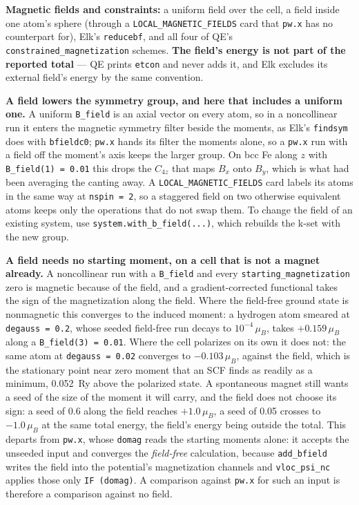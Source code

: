 \documentclass[11pt,a4paper]{article}
\newcommand{\code}[1]{\texttt{\small #1}}
\begin{document}
\textbf{Magnetic fields and constraints:} a uniform field over the cell, a field
inside one atom's sphere (through a \code{LOCAL\_MAGNETIC\_FIELDS} card that
\code{pw.x} has no counterpart for), Elk's \code{reducebf}, and all four of QE's
\code{constrained\_magnetization} schemes. \textbf{The field's energy is not part
of the reported total} --- QE prints \code{etcon} and never adds it, and Elk
excludes its external field's energy by the same convention.

\textbf{A field lowers the symmetry group, and here that includes a uniform
one.} A uniform \code{B\_field} is an axial vector on every atom, so in a
noncollinear run it enters the magnetic symmetry filter beside the moments, as
Elk's \code{findsym} does with \code{bfieldc0}; \code{pw.x} hands its filter
the moments alone, so a \code{pw.x} run with a field off the moment's axis keeps
the larger group. On bcc Fe along $z$ with \code{B\_field(1) = 0.01} this drops
the $C_{4z}$ that maps $B_x$ onto $B_y$, which is what had been averaging the
canting away. A \code{LOCAL\_MAGNETIC\_FIELDS} card labels its atoms in the
same way at \code{nspin = 2}, so a staggered field on two otherwise equivalent
atoms keeps only the operations that do not swap them. To change the field of
an existing system, use \code{system.with\_b\_field(...)}, which rebuilds the
k-set with the new group.

\textbf{A field needs no starting moment, on a cell that is not a magnet
already.} A noncollinear run with a \code{B\_field} and every
\code{starting\_magnetization} zero is magnetic because of the field, and a
gradient-corrected functional takes the sign of the magnetization along the
field. Where the field-free ground state is nonmagnetic this converges to the
induced moment: a hydrogen atom smeared at \code{degauss = 0.2}, whose seeded
field-free run decays to $10^{-4}\,\mu_B$, takes $+0.159\,\mu_B$ along a
\code{B\_field(3) = 0.01}. Where the cell polarizes on its own it does not: the
same atom at \code{degauss = 0.02} converges to $-0.103\,\mu_B$, against the
field, which is the stationary point near zero moment that an SCF finds as
readily as a minimum, 0.052~Ry above the polarized state. A spontaneous magnet
still wants a seed of the size of the moment it will carry, and the field does
not choose its sign: a seed of 0.6 along the field reaches $+1.0\,\mu_B$, a seed
of 0.05 crosses to $-1.0\,\mu_B$ at the same total energy, the field's energy
being outside the total. This departs from \code{pw.x}, whose \code{domag} reads
the starting moments alone: it accepts the unseeded input and converges the
\emph{field-free} calculation, because \code{add\_bfield} writes the field into
the potential's magnetization channels and \code{vloc\_psi\_nc} applies those
only \code{IF (domag)}. A comparison against \code{pw.x} for such an input is
therefore a comparison against no field.
\end{document}
